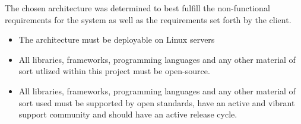 The chosen architecture was determined to best fulfill the non-functional
requirements for the system as well as the requirements set forth by the
client.
\begin{itemize}
	\item The architecture must be deployable on Linux servers
	\item All libraries, frameworks, programming languages and any other
	material of sort utlized within this project must be open-source.
	\item All libraries, frameworks, programming languages and any other
	material of sort used must be supported by open standards, have an 
	active and vibrant support community and should have an active 
	release cycle. 	
\end{itemize}